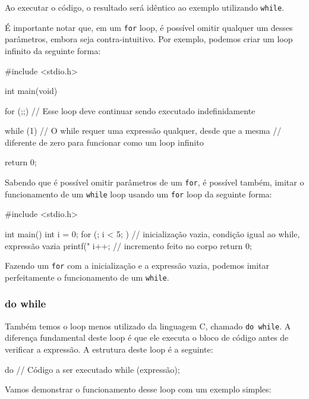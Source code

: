 Ao executar o código, o resultado será idêntico ao exemplo utilizando 
\texttt{while}.

É importante notar que, em um \texttt{for} loop, é possível omitir qualquer 
um desses parâmetros, embora seja contra-intuitivo. Por exemplo, podemos criar 
um loop infinito da seguinte forma:

\begin{excode}
    #include <stdio.h>

    int main(void)
    {
        for (;;) {
            // Esse loop deve continuar sendo executado indefinidamente 
        }

        while (1) {
            // O while requer uma expressão qualquer, desde que a mesma 
            // diferente de zero para funcionar como um loop infinito
        }

        return 0;
    }
\end{excode}

Sabendo que é possível omitir parâmetros de um \texttt{for}, é possível 
também, imitar o funcionamento de um \texttt{while} loop usando um 
\texttt{for} loop da seguinte forma:

\begin{excode}
    #include <stdio.h>

    int main() {
        int i = 0;
        for (; i < 5; ) { // inicialização vazia, condição igual ao while, expressão vazia
            printf("%
            i++; // incremento feito no corpo
        }
        return 0;
    }
\end{excode}

Fazendo um \texttt{for} com a inicialização e a expressão vazia, podemos 
imitar perfeitamente o funcionamento de um \texttt{while}.

\subsubsection{do while}

Também temos o loop menos utilizado da linguagem C, chamado 
\texttt{do while}. A diferença fundamental deste loop é que ele executa o 
bloco de código antes de verificar a expressão. A estrutura deste loop é a 
seguinte:

\begin{excode}
    do {
        // Código a ser executado
    } while (expressão);
\end{excode}

Vamos demonstrar o funcionamento desse loop com um exemplo simples:

